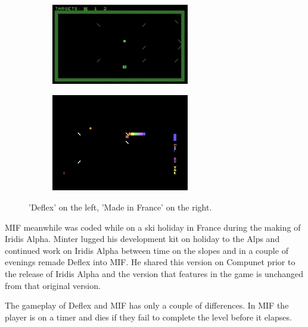\begin{figure}[H]
  {
    \setlength{\tabcolsep}{3.0pt}
    \setlength\cmidrulewidth{\heavyrulewidth} %
	\centering
	\begin{subfigure}{0.5\textwidth}
    \includegraphics[width=6cm]{src/mif/deflex.png}%
	\end{subfigure}
	\begin{subfigure}{0.5\textwidth}
      \includegraphics[width=6cm]{src/mif/mif_game.png}%
	\end{subfigure}
  }

\caption{'Deflex' on the left, 'Made in France' on the right.}
\end{figure}

MIF meanwhile was coded while on a ski holiday in France during the making of Iridis Alpha. Minter lugged his development kit on
holiday to the Alps and continued work on Iridis Alpha between time on the slopes and in a couple of evenings remade Deflex into
MIF. He shared this version on Compunet prior to the release of Iridis Alpha and the version that features in the game is unchanged
from that original version.

The gameplay of Deflex and MIF has only a couple of differences. In MIF the player is on a timer and dies if they fail to
complete the level before it elapses.

